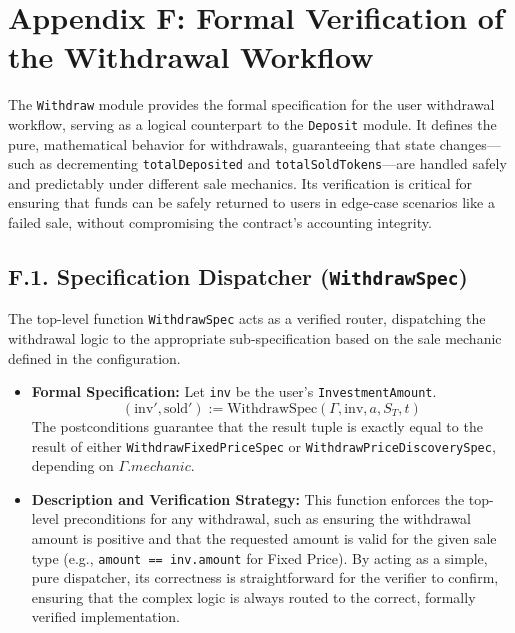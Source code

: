 \documentclass[
  english,
  onecolumn]{article}
\providecommand{\tightlist}{%
  \setlength{\itemsep}{0pt}\setlength{\parskip}{0pt}}
\begin{document}
\section{Appendix F: Formal Verification of the Withdrawal
Workflow}\label{appendix-f-formal-verification-of-the-withdrawal-workflow}

The \texttt{Withdraw} module provides the formal specification for the
user withdrawal workflow, serving as a logical counterpart to the
\texttt{Deposit} module. It defines the pure, mathematical behavior for
withdrawals, guaranteeing that state changes---such as decrementing
\texttt{totalDeposited} and \texttt{totalSoldTokens}---are handled
safely and predictably under different sale mechanics. Its verification
is critical for ensuring that funds can be safely returned to users in
edge-case scenarios like a failed sale, without compromising the
contract's accounting integrity.

\subsection{\texorpdfstring{F.1. Specification Dispatcher
(\texttt{WithdrawSpec})}{F.1. Specification Dispatcher (WithdrawSpec)}}\label{f.1.-specification-dispatcher-withdrawspec}

The top-level function \texttt{WithdrawSpec} acts as a verified router,
dispatching the withdrawal logic to the appropriate sub-specification
based on the sale mechanic defined in the configuration.

\begin{itemize}
\tightlist
\item
  \textbf{Formal Specification:} Let \texttt{inv} be the user's
  \texttt{InvestmentAmount}. \[
  (\text{inv}', \text{sold}') := \text{WithdrawSpec}(\Gamma, \text{inv}, a, S_T, t)
  \] The postconditions guarantee that the result tuple is exactly equal
  to the result of either \texttt{WithdrawFixedPriceSpec} or
  \texttt{WithdrawPriceDiscoverySpec}, depending on \(\Gamma.mechanic\).
\item
  \textbf{Description and Verification Strategy:} This function enforces
  the top-level preconditions for any withdrawal, such as ensuring the
  withdrawal amount is positive and that the requested amount is valid
  for the given sale type (e.g., \texttt{amount\ ==\ inv.amount} for
  Fixed Price). By acting as a simple, pure dispatcher, its correctness
  is straightforward for the verifier to confirm, ensuring that the
  complex logic is always routed to the correct, formally verified
  implementation.
\end{itemize}
\end{document}
